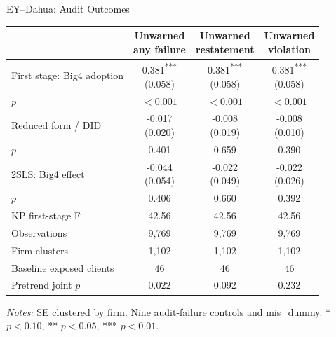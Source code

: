 \documentclass[10pt]{article}
\newcommand{\sym}[1]{\textsuperscript{#1}}
\begin{document}
\fontsize{10}{12}\selectfont
\setlength{\tabcolsep}{4pt}\renewcommand{\arraystretch}{1.15}
\begin{center}\large EY--Dahua: Audit Outcomes\end{center}
\begin{tabular*}{\textwidth}{@{\extracolsep{\fill}}lccc@{}}
\toprule
 & \shortstack{Unwarned\\any failure} & \shortstack{Unwarned\\restatement} & \shortstack{Unwarned\\violation} \\
\midrule
First stage: Big4 adoption & \shortstack{0.381\sym{***}\\(0.058)} & \shortstack{0.381\sym{***}\\(0.058)} & \shortstack{0.381\sym{***}\\(0.058)} \\
$p$ & $<0.001$ & $<0.001$ & $<0.001$ \\
Reduced form / DID & \shortstack{-0.017\\(0.020)} & \shortstack{-0.008\\(0.019)} & \shortstack{-0.008\\(0.010)} \\
$p$ & 0.401 & 0.659 & 0.390 \\
2SLS: Big4 effect & \shortstack{-0.044\\(0.054)} & \shortstack{-0.022\\(0.049)} & \shortstack{-0.022\\(0.026)} \\
$p$ & 0.406 & 0.660 & 0.392 \\
\midrule
KP first-stage F & 42.56 & 42.56 & 42.56 \\
Observations & 9,769 & 9,769 & 9,769 \\
Firm clusters & 1,102 & 1,102 & 1,102 \\
Baseline exposed clients & 46 & 46 & 46 \\
Pretrend joint $p$ & 0.022 & 0.092 & 0.232 \\
\bottomrule\end{tabular*}\par
\medskip\fontsize{9}{11}\selectfont\textit{Notes:} SE clustered by firm. Nine audit-failure controls and mis\_dummy. * $p<0.10$, ** $p<0.05$, *** $p<0.01$.
\end{document}
